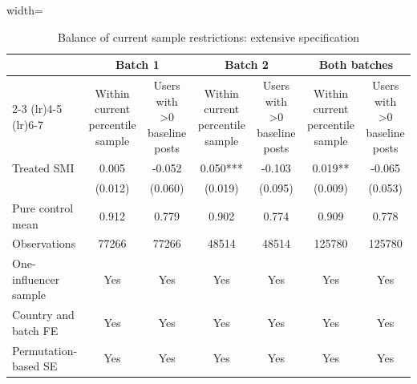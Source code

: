 \begin{table}[!htbp]
    \centering
    \caption{Balance of current sample restrictions: extensive specification}
    \label{tab:sample_restrictions_extensive}
    \scriptsize
    \begin{adjustbox}{width=\textwidth}
    \begin{tabular}{lcccccc}
    \toprule
     & \multicolumn{2}{c}{Batch 1} & \multicolumn{2}{c}{Batch 2} & \multicolumn{2}{c}{Both batches} \\
    \cmidrule(lr){2-3} \cmidrule(lr){4-5} \cmidrule(lr){6-7}
     & Within current percentile sample & Users with >0 baseline posts & Within current percentile sample & Users with >0 baseline posts & Within current percentile sample & Users with >0 baseline posts \\
    \midrule
    Treated SMI & 0.005 & -0.052 & 0.050*** & -0.103 & 0.019** & -0.065 \\
     & (0.012) & (0.060) & (0.019) & (0.095) & (0.009) & (0.053) \\
    Pure control mean & 0.912 & 0.779 & 0.902 & 0.774 & 0.909 & 0.778 \\
    Observations & 77266 & 77266 & 48514 & 48514 & 125780 & 125780 \\
    One-influencer sample & Yes & Yes & Yes & Yes & Yes & Yes \\
    Country and batch FE & Yes & Yes & Yes & Yes & Yes & Yes \\
    Permutation-based SE & Yes & Yes & Yes & Yes & Yes & Yes \\
    \bottomrule
    \end{tabular}
    \end{adjustbox}
\end{table}
